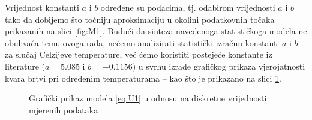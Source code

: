 \documentclass[a4paper,12pt,oneside]{memoir}
\newcommand{\pgfmathparseFPU}[1]{\begingroup%
\pgfkeys{/pgf/fpu,/pgf/fpu/output format=fixed}%
\pgfmathparse{#1}%
\pgfmathsmuggle\pgfmathresult\endgroup}
\begin{document}
        Vrijednost konstanti $a$ i $b$ određene su podacima, tj. odabirom vrijednosti $a$ i $b$ tako da dobijemo što točniju aproksimaciju u okolini podatkovnih točaka prikazanih na slici \ref{fig:M1}. Budući da sinteza navedenoga statističkoga modela ne obuhvaća temu ovoga rada, nećemo analizirati statistički izračun konstanti $a$ i $b$ za slučaj Celzijeve temperature, već ćemo koristiti postejeće konstante iz literature ($a=5.085$ i $b=-0.1156$)\cite{Dekking} u svrhu izrade grafičkog prikaza vjerojatnosti kvara brtvi pri određenim temperaturama -- kao što je prikazano na slici \ref{fig:M2}.
        
        \begin{figure}[H]
            \centering
            \caption{Grafički prikaz modela \eqref{eq:U1} u odnosu na diskretne vrijednosti mjerenih podataka \cite{Dekking}}
            \label{fig:M2}
        \end{figure}
\end{document}
